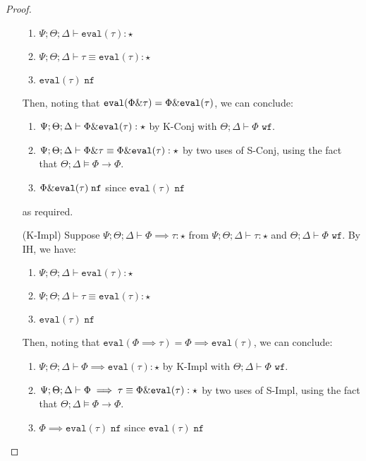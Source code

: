 \begin{proof}
\begin{enumerate}
  \begin{enumerate}[1.]
    \item $\Psi ; \Theta ; \Delta \vdash \texttt{eval}(\tau) : \star$
    \item $\Psi ; \Theta ; \Delta \vdash \tau \equiv \texttt{eval}(\tau) : \star$
    \item $\texttt{eval}(\tau) \; \texttt{nf}$
  \end{enumerate}
  Then, noting that $\texttt{eval}(\Phi \& \tau) = \Phi \& \texttt{eval}(\tau)$, we can conclude:
  \begin{enumerate}[1.]
    \item $\Psi ; \Theta ; \Delta \vdash \Phi \&\texttt{eval}(\tau) : \star$ by K-Conj with $\Theta ; \Delta \vdash \Phi \texttt{ wf}$.
    \item $\Psi ; \Theta ; \Delta \vdash \Phi \& \tau \equiv \Phi \&\texttt{eval}(\tau) : \star$ by two uses of S-Conj, using the fact that $\Theta ; \Delta \vDash \Phi \to \Phi$.
    \item $\Phi \&\texttt{eval}(\tau) \; \texttt{nf}$ since $\texttt{eval}(\tau) \; \texttt{nf}$
  \end{enumerate}
  as required.
  \item[(K-Impl)] Suppose ${\Psi ; \Theta ; \Delta \vdash \Phi \implies \tau : \star}$ from $\Psi ; \Theta ; \Delta \vdash \tau : \star$ and $\Theta ; \Delta \vdash \Phi \texttt{ wf}$. By  IH, we have:
  \begin{enumerate}[1.]
    \item $\Psi ; \Theta ; \Delta \vdash \texttt{eval}(\tau) : \star$
    \item $\Psi ; \Theta ; \Delta \vdash \tau \equiv \texttt{eval}(\tau) : \star$
    \item $\texttt{eval}(\tau) \; \texttt{nf}$
  \end{enumerate}
  Then, noting that $\texttt{eval}(\Phi \implies \tau) = \Phi \implies \texttt{eval}(\tau)$, we can conclude:
  \begin{enumerate}[1.]
    \item $\Psi ; \Theta ; \Delta \vdash \Phi \implies\texttt{eval}(\tau) : \star$ by K-Impl with $\Theta ; \Delta \vdash \Phi \texttt{ wf}$.
    \item $\Psi ; \Theta ; \Delta \vdash \Phi \implies \tau \equiv \Phi \&\texttt{eval}(\tau) : \star$ by two uses of S-Impl, using the fact that $\Theta ; \Delta \vDash \Phi \to \Phi$.
    \item $\Phi \implies\texttt{eval}(\tau) \; \texttt{nf}$ since $\texttt{eval}(\tau) \; \texttt{nf}$

\end{enumerate}
\end{enumerate}
\end{proof}
